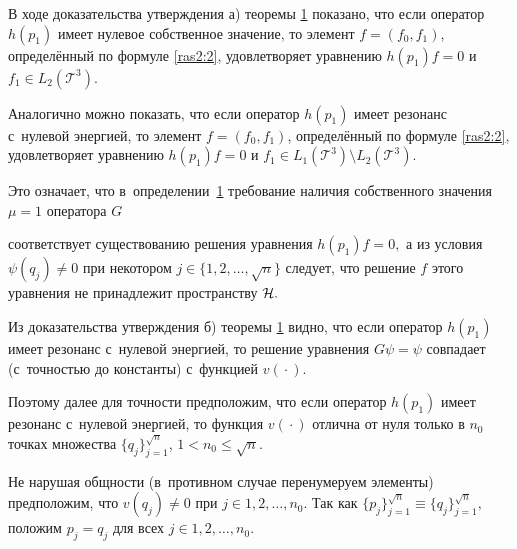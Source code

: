 В ходе доказательства утверждения а) теоремы \hyperlink{ras2:thm:1}{1} показано, что если оператор $h(p_1)$ имеет нулевое собственное значение, то элемент $f=(f_0, f_1)$, определённый по формуле \eqref{ras2:2}, удовлетворяет уравнению $h(p_1)f=0$ и $f_1\in L_2({\mathcal T}^3).$ 

Аналогично можно показать, что если оператор $h(p_1)$ имеет резонанс с~нулевой энергией, то элемент $f=(f_0, f_1)$, определённый по формуле \eqref{ras2:2}, удовлетворяет уравнению $h(p_1)f=0$ и $f_1\in L_1({\mathcal T}^3)\setminus L_2({\mathcal T}^3).$ 

Это означает, что в~определении~\hyperlink{ras2:def:1}{1} требование наличия собственного значения $\mu=1$ оператора $G$

соответствует существованию решения уравнения $h(p_{1})f=0,$ а из условия $\psi(q_j)\neq 0$ при некотором $j\in \{1, 2, \dots,

\sqrt{n}\}$ следует, что решение $f$ этого уравнения не принадлежит пространству ${\cal H}.$



Из доказательства утверждения б) теоремы \hyperlink{ras2:thm:1}{1}  видно, что если оператор $h(p_1)$ имеет резонанс с~нулевой энергией, то решение уравнения $G \psi=\psi$ совпадает (с~точностью до константы) с~функцией $v({}\cdot{})$. 

Поэтому далее для точности предположим, что если оператор $h(p_1)$ имеет резонанс с~нулевой энергией, то функция $v({}\cdot{})$ отлична от нуля только в $n_0$ точках множества $\{q_j\}_{j=1}^{\sqrt{n}}$, $1<n_0\leq \sqrt{n}$. 

Не нарушая общности (в~противном случае перенумеруем элементы) предположим, что $v(q_j) \neq 0$ при $j\in{1, 2, \dots, n_0}.$ Так как $\{p_j\}_{j=1}^{\sqrt{n}} \equiv \{q_j\}_{j=1}^{\sqrt{n}},$ положим $p_j=q_j$ для всех $j\in{1, 2, \dots, n_0}.$

\hypertarget{ras2:thm:2}{\smallskip}

